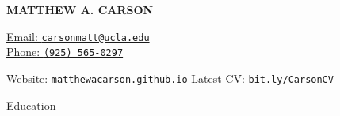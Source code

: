 \documentclass[12pt]{resume} %
\newcommand{\righthandindent}{1in}
\begin{document}
\centerline{\MakeUppercase{\huge\bfseries{Matthew A. Carson}}}
\href{mailto:carsonmatt@ucla.edu}{Email: \texttt{carsonmatt@ucla.edu}}\hfill\\
\href{tel:9255650297}{Phone: \texttt{(925) 565-0297}}\hfill\\
\centerline{\href{http://matthewacarson.github.io}{Website: \texttt{matthewacarson.github.io}} \hfill \href{https://bit.ly/CarsonCV}{Latest CV: \texttt{bit.ly/CarsonCV}}}



\thispagestyle{firstpagestyle}
\raggedright
\renewcommand{\labelitemi}{\scriptsize$\bullet$}
\begin{rSection}{Education}


\end{rSection}
\end{document}
